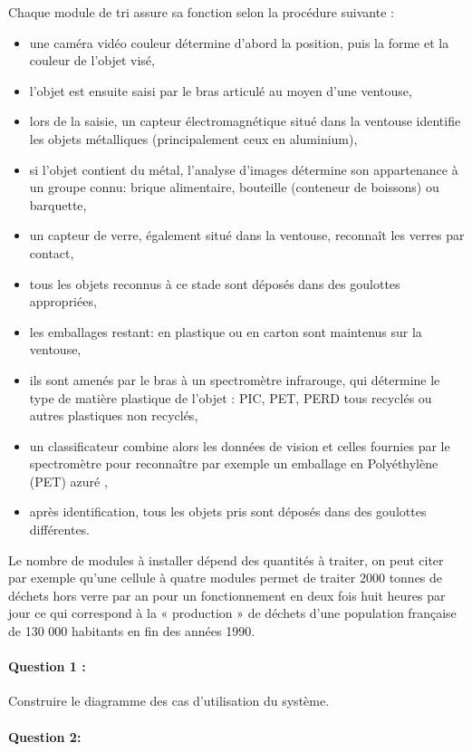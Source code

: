 Chaque module de tri assure sa fonction selon la procédure suivante :
\begin{itemize}
 \item une caméra vidéo couleur détermine d'abord la position, puis la forme et la couleur de l'objet visé,
 \item l'objet est ensuite saisi par le bras articulé au moyen d'une ventouse,
 \item lors de la saisie, un capteur électromagnétique situé dans la ventouse identifie les objets métalliques (principalement ceux en aluminium),
 \item si l'objet contient du métal, l'analyse d'images détermine son appartenance à un groupe connu: brique alimentaire, bouteille (conteneur de boissons) ou barquette,
 \item un capteur de verre, également situé dans la ventouse, reconnaît les verres par contact,
 \item tous les objets reconnus à ce stade sont déposés dans des goulottes appropriées,
 \item les emballages restant: en plastique ou en carton sont maintenus sur la ventouse,
 \item ils sont amenés par le bras à un spectromètre infrarouge, qui détermine le type de matière plastique de l'objet : PIC, PET, PERD tous recyclés ou autres plastiques non recyclés,
 \item un classificateur combine alors les données de vision et celles fournies par le spectromètre pour reconnaître par exemple un emballage en \og Polyéthylène (PET) azuré \fg,
 \item après identification, tous les objets pris sont déposés dans des goulottes différentes.
\end{itemize}

Le nombre de modules à installer dépend des quantités à traiter, on peut citer par exemple qu'une cellule à quatre modules permet de traiter 2000 tonnes de déchets hors verre par an pour un fonctionnement en deux fois huit heures par jour ce qui correspond à la « production » de déchets d'une population française de 130 000 habitants en fin des années 1990.

\paragraph{Question 1 :}

Construire le diagramme des cas d'utilisation du système.

\paragraph{Question 2:}

